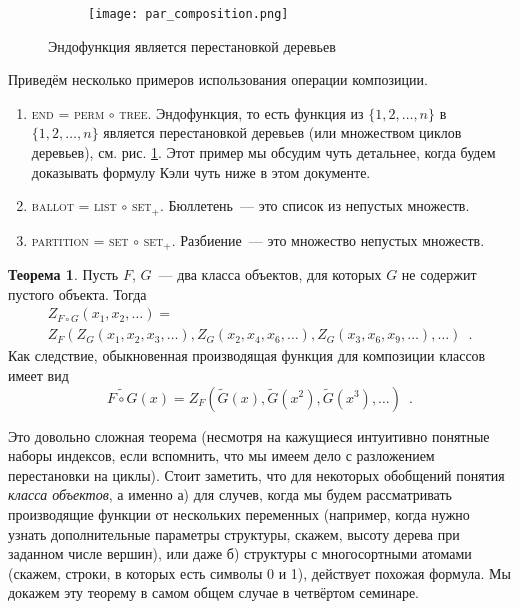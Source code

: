 \documentclass[a5paper]{article}
\theoremstyle{definition}
\newtheorem*{theorem}{Теорема}
\begin{document}
\begin{figure}[h]
\centering
\begin{subfigure}{.8\textwidth}
    \centering
    \texttt{[image: par\_composition.png]}
\end{subfigure}%
\caption{Эндофункция является перестановкой деревьев}
\label{fig:composition}	
\end{figure}

Приведём несколько примеров использования операции композиции.
\begin{enumerate}
    \item \textsc{end} = \textsc{perm} \( \circ \) \textsc{tree}. Эндофункция,
то есть функция из \(
 \{1,2,\ldots, n\}\) в \( \{1,2,\ldots, n\} \) является перестановкой деревьев (или множеством циклов
деревьев), см. рис. \ref{fig:composition}. Этот пример мы обсудим чуть
детальнее, когда будем доказывать формулу Кэли чуть ниже в этом документе.
    \item \textsc{ballot} = \textsc{list} \( \circ \) \textsc{set}$_+$.
Бюллетень~--- это список из непустых множеств.
    \item \textsc{partition} = \textsc{set} \( \circ \) \textsc{set}$_+$.
Разбиение~--- это множество непустых множеств.
\end{enumerate}

\begin{theorem}
	Пусть \( F \), \( G \)~--- два класса объектов, для 
	которых \( G \) не содержит пустого объекта. Тогда
	\begin{multline*}
		Z_{F \circ G}(x_1, x_2, \ldots) =\\ Z_F(
			Z_G(x_1, x_2, x_3, \ldots),
			Z_G(x_2, x_4, x_6, \ldots),
            Z_G(x_3, x_6, x_9, \ldots),
			\ldots
		) \enspace .
	\end{multline*}
	Как следствие, обыкновенная производящая функция для композиции классов имеет вид
	\[
		\widetilde{F \circ G}(x) = Z_F(\widetilde G(x), \widetilde G(x^2), 
		\widetilde G(x^3), \ldots)
		\enspace .
	\]
\end{theorem}
Это довольно сложная теорема (несмотря на кажущиеся интуитивно понятные наборы
индексов, если вспомнить, что мы имеем дело с разложением перестановки на циклы).
Стоит заметить, что для некоторых обобщений понятия \textit{класса объектов}, а именно
а) для случев, когда мы будем рассматривать производящие функции от нескольких
переменных (например, когда нужно узнать дополнительные параметры структуры,
скажем, высоту дерева при заданном числе вершин), или даже б) структуры с
многосортными атомами
(скажем, строки, в которых есть символы 0 и 1), действует похожая формула.
Мы докажем эту теорему в самом общем случае в четвёртом семинаре.
\end{document}
